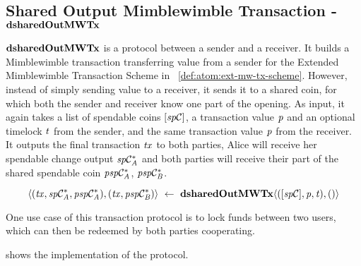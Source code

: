\subsection{Shared Output Mimblewimble Transaction - $\mathbf{dsharedOutMWTx}$} \label{subsec:atom:shared-out-mw-tx}

$\mathbf{dsharedOutMWTx}$ is a protocol between a sender and a receiver.
It builds a Mimblewimble transaction transferring value from a sender for the Extended Mimblewimble Transaction Scheme in ~\cref{def:atom:ext-mw-tx-scheme}.
However, instead of simply sending value to a receiver, it sends it to a shared coin, for which both the sender and receiver know one part of the opening.
As input, it again takes a list of spendable coins $[\mathit{sp}\mathcal{C}]$, a transaction value $\mathit{p}$ and an optional timelock $\mathit{t}$ from the sender, and the same transaction value $\mathit{p}$ from the receiver.
It outputs the final transaction $\mathit{tx}$ to both parties, Alice will receive her spendable change output $\mathit{sp}\mathcal{C}_{\mathit{A}}^*$ and both parties will receive their part of the shared spendable coin $\mathit{psp}\mathcal{C}_{\mathit{A}}^*$, $\mathit{psp}\mathcal{C}_{\mathit{B}}^*$.

\[ \langle (\mathit{tx}, \mathit{sp}\mathcal{C}_{\mathit{A}}^*, \mathit{psp}\mathcal{C}_{\mathit{A}}^*), (\mathit{tx}, \mathit{psp}\mathcal{C}_{\mathit{B}}^*) \rangle ~\leftarrow~ \mathbf{dsharedOutMWTx} \langle([\mathit{sp}\mathcal{C}],\mathit{p},\mathit{t}), () \rangle \]

One use case of this transaction protocol is to lock funds between two users, which can then be redeemed by both parties cooperating.

 shows the implementation of the protocol.

